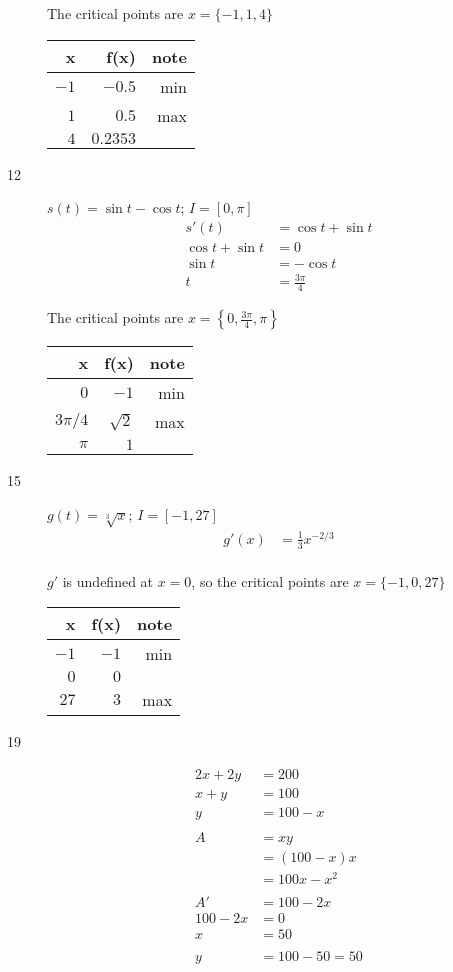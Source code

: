 \documentclass[fleqn]{exam}
\begin{document}
\begin{description}
The critical points are $x = \{-1, 1, 4 \}$

\begin{tabular}{rrr}
\toprule
x   & f(x) & note \\
\midrule
$-1$ &  $-0.5$   &  min \\
$1$  &  $0.5$    &  max \\
$4$  &  $0.2353$ &   \\
\bottomrule
\end{tabular}


\item[12] 
$s(t) = \sin t - \cos t$; $I = [0, \pi]$
\begin{align*}
  s'(t) &= \cos t + \sin t \\
  \cos t + \sin t &= 0 \\
  \sin t &= -\cos t \\
  t &= \frac{3\pi}{4}
\end{align*}

The critical points are $x = \left\{0, \frac{3\pi}{4}, \pi \right \}$

\begin{tabular}{rrr}
\toprule
x   & f(x) & note \\
\midrule
$0$               &  $-1$       &  min \\
$3\pi/4$  &  $\sqrt{2}$    &  max \\
$\pi$             &  $1$ &   \\
\bottomrule
\end{tabular}

\item[15] 
$g(t) = \sqrt[3]{x}$; $I = [-1, 27]$
\begin{align*}
  g'(x) &= \frac{1}{3} x^{-2/3} \\
\end{align*}

$g'$ is undefined at $x = 0$, so the critical points are $x = \{-1, 0, 27\}$

\begin{tabular}{rrr}
\toprule
x   & f(x) & note \\
\midrule
$-1$ & $-1$ & min \\
$0$  & $0$  &     \\
$27$ & $3$  & max \\
\bottomrule
\end{tabular}

\item[19]
\begin{align*}
  2x + 2y &= 200 \\
  x + y &= 100 \\
  y &= 100 - x \\
\\
  A &= xy \\
    &= (100 - x) x \\
    &= 100x - x^2 \\
\\
  A' &= 100 - 2x \\
  100 - 2x &= 0 \\
  x &= 50 \\
\\
  y &= 100 - 50 = 50 \\
\end{align*}


\end{description}
\end{document}
